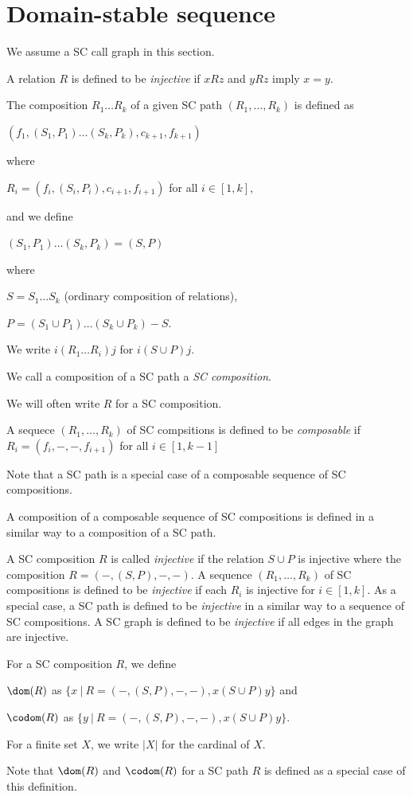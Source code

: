 \section{Domain-stable sequence}

We assume a SC call graph in this section.

\begin{Def}[Injective]\rm
A relation $R$ is defined to be {\em injective}
if $x R z$ and $y R z$ imply $x=y$.
\end{Def}

\begin{Def}\rm
The composition $R_1\ldots R_k$ of a given SC path $(R_1,\ldots,R_k)$ is
defined as

$(f_1,(S_1,P_1)\ldots(S_k,P_k),c_{k+1},f_{k+1})$

where

$R_i=(f_i,(S_i,P_i),c_{i+1},f_{i+1})$ for all $i \in [1,k]$,

and we define

$(S_1,P_1)\ldots(S_k,P_k) = (S,P)$

where

$S = S_1\ldots S_k$ (ordinary composition of relations),

$P = (S_1 \cup P_1)\ldots (S_k \cup P_k) - S$.

We write $i(R_1\ldots R_i)j$ for $i (S \cup P) j$.

We call a composition of a SC path a {\em SC composition}.

We will often write $R$ for a SC composition.

A sequece $(R_1,\ldots,R_k)$ of SC compsitions 
is defined to be {\em composable} if
$R_i = (f_i,-,-,f_{i+1})$ for all $i \in [1,k-1]$

Note that a SC path is a special case of a composable sequence of SC compositions.

A composition of a composable sequence of SC compositions
is defined in a similar way to a composition of a SC path.

A SC composition $R$ is called {\em injective} if
the relation $S \cup P$ is injective
where
the composition $R = (-,(S,P),-,-)$.
A sequence $(R_1,\ldots,R_k)$ of SC compositions is defined to be {\em injective} if
each $R_i$ is injective for $i \in [1,k]$.
As a special case,
a SC path is defined to be {\em injective} in a similar way to 
a sequence of SC compositions.
A SC graph is defined to be {\em injective} if all edges in the graph are
injective.

For a SC composition $R$, we define

$\dom(R)$ as $\{x \ |\ R = (-,(S,P),-,-), x(S \cup P)y \}$ and

$\codom(R)$ as $\{y \ |\ R = (-,(S,P),-,-), x(S \cup P)y \}$.

For a finite set $X$, we write $|X|$ for the cardinal of $X$.

Note that $\dom(R)$ and $\codom(R)$ for a SC path $R$ is 
defined as a special case of this definition.
\end{Def}

